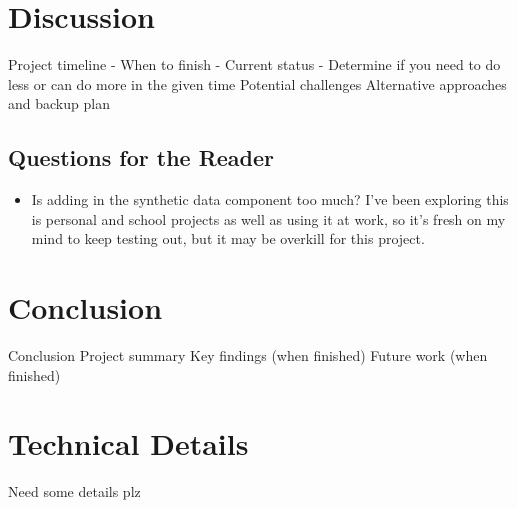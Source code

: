 \documentclass[sigconf, authorversion, nonacm]{acmart}
\begin{document}
\section{Discussion}
Project timeline
    - When to finish
    - Current status
    - Determine if you need to do less or can do more in the given time
Potential challenges
Alternative approaches and backup plan

\subsection{Questions for the Reader}
    \begin{itemize}
        \item Is adding in the synthetic data component too much? I've been exploring this is personal and school projects as well as using it at work, so it's fresh on my mind to keep testing out, but it may be overkill for this project.
    \end{itemize}

\section{Conclusion}
Conclusion
Project summary
Key findings (when finished)
Future work (when finished)





\appendix

\section{Technical Details}

    Need some details plz
\end{document}
